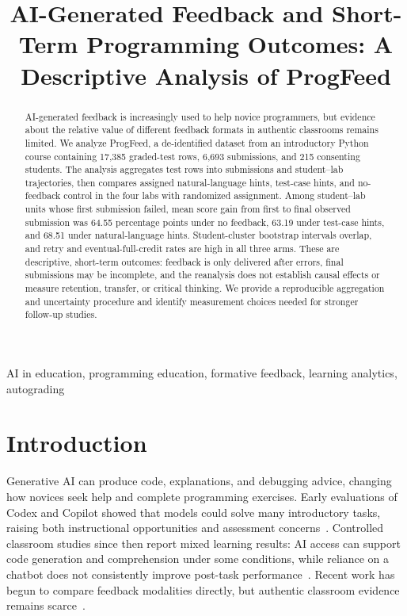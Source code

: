 \documentclass[conference]{IEEEtran}
\title{AI-Generated Feedback and Short-Term Programming Outcomes: A Descriptive Analysis of ProgFeed}
\author{\IEEEauthorblockN{Adi Irgimbayev and Alan Shmyrin}
\IEEEauthorblockA{Research project, Task 4}}
\begin{document}
\maketitle

\begin{abstract}
AI-generated feedback is increasingly used to help novice programmers, but evidence about the relative value of different feedback formats in authentic classrooms remains limited. We analyze ProgFeed, a de-identified dataset from an introductory Python course containing 17,385 graded-test rows, 6,693 submissions, and 215 consenting students. The analysis aggregates test rows into submissions and student--lab trajectories, then compares assigned natural-language hints, test-case hints, and no-feedback control in the four labs with randomized assignment. Among student--lab units whose first submission failed, mean score gain from first to final observed submission was 64.55 percentage points under no feedback, 63.19 under test-case hints, and 68.51 under natural-language hints. Student-cluster bootstrap intervals overlap, and retry and eventual-full-credit rates are high in all three arms. These are descriptive, short-term outcomes: feedback is only delivered after errors, final submissions may be incomplete, and the reanalysis does not establish causal effects or measure retention, transfer, or critical thinking. We provide a reproducible aggregation and uncertainty procedure and identify measurement choices needed for stronger follow-up studies.
\end{abstract}

\begin{IEEEkeywords}
AI in education, programming education, formative feedback, learning analytics, autograding
\end{IEEEkeywords}

\section{Introduction}\label{sec:intro}
Generative AI can produce code, explanations, and debugging advice, changing how novices seek help and complete programming exercises. Early evaluations of Codex and Copilot showed that models could solve many introductory tasks, raising both instructional opportunities and assessment concerns~\cite{finnie2022,wermelinger2023,becker2023}. Controlled classroom studies since then report mixed learning results: AI access can support code generation and comprehension under some conditions, while reliance on a chatbot does not consistently improve post-task performance~\cite{kazemitabaar2023,xue2024,sun2024}. Recent work has begun to compare feedback modalities directly, but authentic classroom evidence remains scarce~\cite{heickal2026}.
\end{document}
